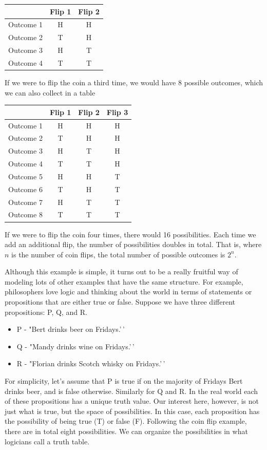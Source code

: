 \documentclass[]{tufte-book}
\providecommand{\tightlist}{%
  \setlength{\itemsep}{0pt}\setlength{\parskip}{0pt}}
\begin{document}
\begin{longtable}[]{@{}lcc@{}}
\toprule
& Flip 1 & Flip 2\tabularnewline
\midrule
\endhead
Outcome 1 & H & H\tabularnewline
Outcome 2 & T & H\tabularnewline
Outcome 3 & H & T\tabularnewline
Outcome 4 & T & T\tabularnewline
\bottomrule
\end{longtable}

If we were to flip the coin a third time, we would have 8 possible outcomes, which we can also collect in a table

\begin{longtable}[]{@{}lccc@{}}
\toprule
& Flip 1 & Flip 2 & Flip 3\tabularnewline
\midrule
\endhead
Outcome 1 & H & H & H\tabularnewline
Outcome 2 & T & H & H\tabularnewline
Outcome 3 & H & T & H\tabularnewline
Outcome 4 & T & T & H\tabularnewline
Outcome 5 & H & H & T\tabularnewline
Outcome 6 & T & H & T\tabularnewline
Outcome 7 & H & T & T\tabularnewline
Outcome 8 & T & T & T\tabularnewline
\bottomrule
\end{longtable}

If we were to flip the coin four times, there would 16 possibilities. Each time we add an additional flip, the number of possibilities doubles in total. That is, where \(n\) is the number of coin flips, the total number of possible outcomes is \(2^n\).

Although this example is simple, it turns out to be a really fruitful way of modeling lots of other examples that have the same structure. For example, philosophers love logic and thinking about the world in terms of statements or propositions that are either true or false. Suppose we have three different propositions: P, Q, and R.

\begin{itemize}
\tightlist
\item
  P - "Bert drinks beer on Fridays.'\,'
\item
  Q - "Mandy drinks wine on Fridays.'\,'
\item
  R - "Florian drinks Scotch whisky on Fridays.'\,'
\end{itemize}

For simplicity, let's assume that P is true if on the majority of Fridays Bert drinks beer, and is false otherwise. Similarly for Q and R. In the real world each of these propositions has a unique truth value. Our interest here, however, is not just what is true, but the space of possibilities. In this case, each proposition has the possibility of being true (T) or false (F). Following the coin flip example, there are in total eight possibilities. We can organize the possibilities in what logicians call a truth table.
\end{document}
